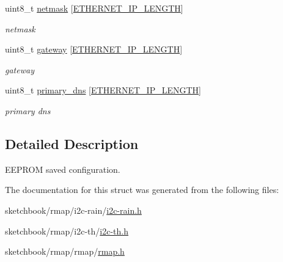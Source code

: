 \begin{DoxyCompactItemize}
\mbox{\label{structconfiguration__t_a60716ed8c6a82119a46eb6345b88ca32}} 
uint8\+\_\+t \hyperlink{structconfiguration__t_a60716ed8c6a82119a46eb6345b88ca32}{netmask} \mbox{[}\hyperlink{ethernet__config_8h_ae8de53528e88d8ff4516d82a48590bd7}{E\+T\+H\+E\+R\+N\+E\+T\+\_\+\+I\+P\+\_\+\+L\+E\+N\+G\+TH}\mbox{]}
\begin{DoxyCompactList}\small\item\em netmask \end{DoxyCompactList}\item 
\mbox{\label{structconfiguration__t_a9d18b7f4094f4d7a50d2245e0370adc0}} 
uint8\+\_\+t \hyperlink{structconfiguration__t_a9d18b7f4094f4d7a50d2245e0370adc0}{gateway} \mbox{[}\hyperlink{ethernet__config_8h_ae8de53528e88d8ff4516d82a48590bd7}{E\+T\+H\+E\+R\+N\+E\+T\+\_\+\+I\+P\+\_\+\+L\+E\+N\+G\+TH}\mbox{]}
\begin{DoxyCompactList}\small\item\em gateway \end{DoxyCompactList}\item 
\mbox{\label{structconfiguration__t_acd481c434576a90959c342e877985b32}} 
uint8\+\_\+t \hyperlink{structconfiguration__t_acd481c434576a90959c342e877985b32}{primary\+\_\+dns} \mbox{[}\hyperlink{ethernet__config_8h_ae8de53528e88d8ff4516d82a48590bd7}{E\+T\+H\+E\+R\+N\+E\+T\+\_\+\+I\+P\+\_\+\+L\+E\+N\+G\+TH}\mbox{]}
\begin{DoxyCompactList}\small\item\em primary dns \end{DoxyCompactList}\end{DoxyCompactItemize}


\subsection{Detailed Description}
E\+E\+P\+R\+OM saved configuration. 

The documentation for this struct was generated from the following files\+:\begin{DoxyCompactItemize}
\item 
sketchbook/rmap/i2c-\/rain/\hyperlink{i2c-rain_8h}{i2c-\/rain.\+h}\item 
sketchbook/rmap/i2c-\/th/\hyperlink{i2c-th_8h}{i2c-\/th.\+h}\item 
sketchbook/rmap/rmap/\hyperlink{rmap_8h}{rmap.\+h}\end{DoxyCompactItemize}
